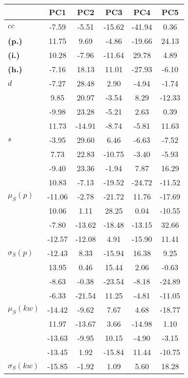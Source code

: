 \begin{table}[h!]
\begin{center}
\begin{tabular}{| l || c | c | c | c | c |}\hline
 & {\bf PC1} & {\bf PC2} & {\bf PC3} & {\bf PC4} & {\bf PC5} \\\hline\hline
{\bf $cc$} & -7.59 & -5.51 & -15.62 & -41.94 & 0.36 \\
{\bf (p.)} & 11.75 & 9.69 & -4.86 & -19.66 & 24.13 \\
{\bf (i.)} & 10.28 & -7.96 & -11.64 & 29.78 & 4.89 \\
{\bf (h.)} & -7.16 & 18.13 & 11.01 & -27.93 & -6.10 \\\hline
{\bf $d$} & -7.27 & 28.48 & 2.90 & -4.94 & -1.74 \\
{\bf } & 9.85 & 20.97 & -3.54 & 8.29 & -12.33 \\
{\bf } & -9.98 & 23.28 & -5.21 & 2.63 & 0.39 \\
{\bf } & 11.73 & -14.91 & -8.74 & -5.81 & 11.63 \\\hline
{\bf $s$} & -3.95 & 29.60 & 6.46 & -6.63 & -7.52 \\
{\bf } & 7.73 & 22.83 & -10.75 & -3.40 & -5.93 \\
 & -9.40  & 23.36  & -1.94  & 7.87  & 16.29 \\
 & 10.83  & -7.13  & -19.52  & -24.72  & -11.52 \\\hline
$\mu_S(p)$ & -11.06  & -2.78  & -21.72  & 11.76  & -17.69 \\
 & 10.06  & 1.11  & 28.25  & 0.04  & -10.55 \\
 & -7.80  & -13.62  & -18.48  & -13.15  & 32.66 \\
 & -12.57  & -12.08  & 4.91  & -15.90  & 11.41 \\\hline
$\sigma_S(p)$ & -12.43  & 8.33  & -15.94  & 16.38  & 9.25 \\
 & 13.95  & 0.46  & 15.44  & 2.06  & -0.63 \\
 & -8.63  & -0.38  & -23.54  & -8.18  & -24.89 \\
 & -6.33  & -21.54  & 11.25  & -4.81  & -11.05 \\\hline
$\mu_S(kw)$ & -14.42  & -9.62  & 7.67  & 4.68  & -18.77 \\
 & 11.97  & -13.67  & 3.66  & -14.98  & 1.10 \\
 & -13.63  & -9.95  & 10.15  & -4.90  & -3.15 \\
 & -13.45  & 1.92  & -15.84  & 11.44  & -10.75 \\\hline
$\sigma_S(kw)$ & -15.85  & -1.92  & 1.09  & 5.60  & 18.28 \\

\end{tabular}
\end{center}
\end{table}
